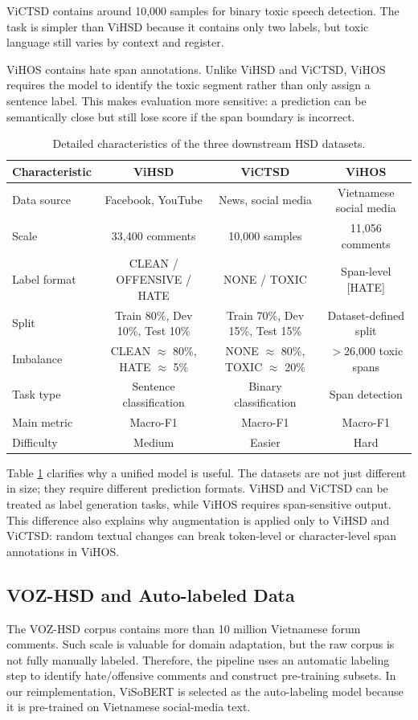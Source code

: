 \documentclass[journal]{IEEEtran}
\begin{document}
ViCTSD contains around 10,000 samples for binary toxic speech detection. The task is simpler than ViHSD because it contains only two labels, but toxic language still varies by context and register.

ViHOS contains hate span annotations. Unlike ViHSD and ViCTSD, ViHOS requires the model to identify the toxic segment rather than only assign a sentence label. This makes evaluation more sensitive: a prediction can be semantically close but still lose score if the span boundary is incorrect.

\begin{table}[!t]
\centering
\caption{Detailed characteristics of the three downstream HSD datasets.}
\label{tab:downstream_detail}
\begin{tabular}{lccc}
\toprule
\textbf{Characteristic} & \textbf{ViHSD} & \textbf{ViCTSD} & \textbf{ViHOS} \\
\midrule
Data source & Facebook, YouTube & News, social media & Vietnamese social media \\
Scale & 33,400 comments & 10,000 samples & 11,056 comments \\
Label format & CLEAN / OFFENSIVE / HATE & NONE / TOXIC & Span-level [HATE] \\
Split & Train 80\%, Dev 10\%, Test 10\% & Train 70\%, Dev 15\%, Test 15\% & Dataset-defined split \\
Imbalance & CLEAN $\approx$ 80\%, HATE $\approx$ 5\% & NONE $\approx$ 80\%, TOXIC $\approx$ 20\% & $>$26,000 toxic spans \\
Task type & Sentence classification & Binary classification & Span detection \\
Main metric & Macro-F1 & Macro-F1 & Macro-F1 \\
Difficulty & Medium & Easier & Hard \\
\bottomrule
\end{tabular}
\end{table}

Table \ref{tab:downstream_detail} clarifies why a unified model is useful. The datasets are not just different in size; they require different prediction formats. ViHSD and ViCTSD can be treated as label generation tasks, while ViHOS requires span-sensitive output. This difference also explains why augmentation is applied only to ViHSD and ViCTSD: random textual changes can break token-level or character-level span annotations in ViHOS.

\subsection{VOZ-HSD and Auto-labeled Data}
The VOZ-HSD corpus contains more than 10 million Vietnamese forum comments. Such scale is valuable for domain adaptation, but the raw corpus is not fully manually labeled. Therefore, the pipeline uses an automatic labeling step to identify hate/offensive comments and construct pre-training subsets. In our reimplementation, ViSoBERT is selected as the auto-labeling model because it is pre-trained on Vietnamese social-media text.
\end{document}
